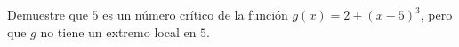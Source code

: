 \item Demuestre que $5$ es un número crítico de la función $g(x) = 2 + (x - 5)^3$, pero que $g$ no tiene un extremo local en $5$.
